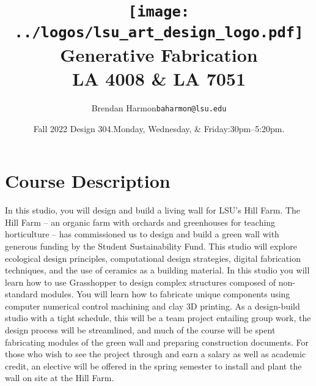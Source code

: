 \documentclass[11pt,article,oneside]{memoir}
\makeatletter
\def\myauthor{Author}
\def\mytitle{Title}
\def\myemail{baharmon@lsu.edu}
\def\myauthor{Brendan Harmon}
\def\mytitle{\texttt{[image: ../logos/lsu\_art\_design\_logo.pdf]}\\
[0.1cm]{\Large Generative Fabrication} \\ 
[-0.2cm]{\normalfont \normalsize LA 4008 \& LA 7051}}
\newcommand{\globalcolor}[1]{%
  \color{#1}\global\let\default@color\current@color
}
\makeatother
\begin{document}
\setlength\bibitemsep{0.5em}

\setmainfont{Lato Regular}
\setmonofont[Scale=0.8]{IBM Plex Mono}

\def\ind{\hangindent=1 true cm\hangafter=1 \noindent}
\def\labelitemi{$\cdot$}

\title{\LARGE \mytitle}
\author{\Large\myauthor \newline \footnotesize\texttt{\noindent\myemail}}
\date{Fall 2022 Design 304.\newline Monday, Wednesday, \& Friday:30pm--5:20pm.}
\published{\,}



\globalcolor{black}
\vspace*{-10em}
\maketitle

\section{Course Description}

In this studio, you will design and build
a living wall for LSU's Hill Farm.
The Hill Farm --
an organic farm with orchards and greenhouses
for teaching horticulture --
has commissioned us to design and build a green wall
with generous funding by the Student Sustainability Fund.
This studio will explore
ecological design principles,
computational design strategies,
digital fabrication techniques, and
the use of ceramics as a building material.
In this studio you will learn how to use Grasshopper
to design complex structures
composed of non-standard modules.
You will learn how to fabricate unique components
using computer numerical control machining
and clay 3D printing.
As a design-build studio with a tight schedule,
this will be a team project entailing group work,
the design process will be streamlined,
and much of the course will be spent
fabricating modules of the green wall
and preparing construction documents.
For those who wish to see the project through
and earn a salary as well as academic credit,
an elective will be offered in the spring semester
to install and plant the wall on site at the Hill Farm.
\\

\begin{center}
\end{center}
\end{document}
